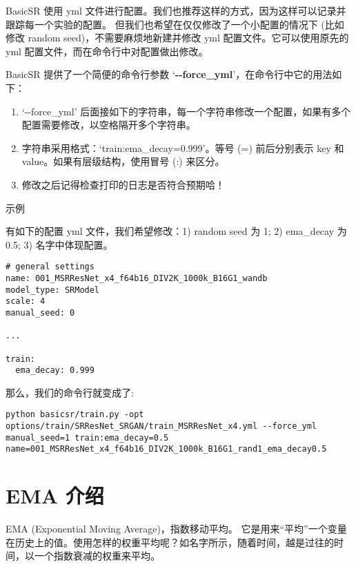 \documentclass[../main.tex]{subfiles}
\begin{document}
BasicSR 使用 yml 文件进行配置。我们也推荐这样的方式，因为这样可以记录并跟踪每一个实验的配置。
但我们也希望在仅仅修改了一个小配置的情况下 (比如修改 random seed)，不需要麻烦地新建并修改 yml 配置文件。它可以使用原先的 yml 配置文件，而在命令行中对配置做出修改。

BasicSR 提供了一个简便的命令行参数 ‘\textbf{-{}-force\_yml}’，在命令行中它的用法如下：

\begin{enumerate}
	\item ‘-{}-force\_yml’ 后面接如下的字符串，每一个字符串修改一个配置，如果有多个配置需要修改，以空格隔开多个字符串。
	\item 字符串采用格式：‘train:ema\_decay=0.999’。等号 (=) 前后分别表示 key 和 value。如果有层级结构，使用冒号 (:) 来区分。
	\item 修改之后记得检查打印的日志是否符合预期哈！
\end{enumerate}

\begin{exampleBox}[]{示例}

	有如下的配置 yml 文件，我们希望修改：1) random seed 为 1; 2) ema\_decay 为0.5; 3) 名字中体现配置。

	\begin{verbatim}
# general settings
name: 001_MSRResNet_x4_f64b16_DIV2K_1000k_B16G1_wandb
model_type: SRModel
scale: 4
manual_seed: 0

...

train:
  ema_decay: 0.999
	\end{verbatim}

	那么，我们的命令行就变成了:
	\begin{verbatim}
python basicsr/train.py -opt options/train/SRResNet_SRGAN/train_MSRResNet_x4.yml --force_yml manual_seed=1 train:ema_decay=0.5 name=001_MSRResNet_x4_f64b16_DIV2K_1000k_B16G1_rand1_ema_decay0.5
	\end{verbatim}
\end{exampleBox}


\section{EMA 介绍}\label{others:ema}

EMA (Exponential Moving Average)，指数移动平均。
它是用来“平均”一个变量在历史上的值。使用怎样的权重平均呢？如名字所示，随着时间，越是过往的时间，以一个指数衰减的权重来平均。
\end{document}
